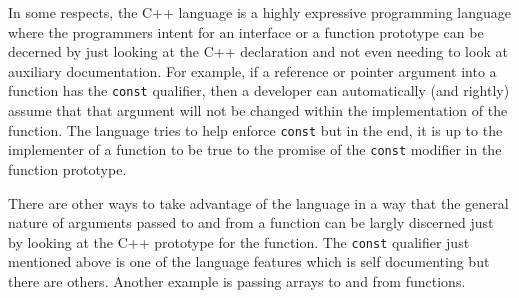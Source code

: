 In some respects, the C++ language is a highly expressive programming
language where the programmers intent for an interface or a function
prototype can be decerned by just looking at the C++ declaration and
not even needing to look at auxiliary documentation.  For example, if
a reference or pointer argument into a function has the \texttt{const}
qualifier, then a developer can automatically (and rightly) assume
that that argument will not be changed within the implementation of
the function.  The language tries to help enforce \texttt{const} but
in the end, it is up to the implementer of a function to be true to
the promise of the \texttt{const} modifier in the function prototype.

There are other ways to take advantage of the language in a way that
the general nature of arguments passed to and from a function can be
largly discerned just by looking at the C++ prototype for the
function.  The \texttt{const} qualifier just mentioned above is one of the language
features which is self documenting but there are others.  Another
example is passing arrays to and from functions.

